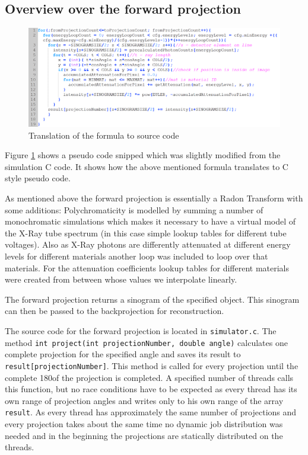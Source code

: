 \subsection{Overview over the forward projection}
\begin{figure}[h!]
	\centering
	\includegraphics[width=\linewidth]{images/MainLoop.png}
	\caption{Translation of the formula to source code}
	\label{MainLoop}
\end{figure}
\par Figure \ref{MainLoop} shows a pseudo code snipped which was slightly modified from the simulation C code. It shows how the above mentioned formula translates to C style pseudo code.
\par As mentioned above the forward projection is essentially a Radon Transform with some additions: Polychromaticity is modelled by summing a number of monochromatic simulations which makes it necessary to have a virtual model of the X-Ray tube spectrum (in this case simple lookup tables for different tube voltages). Also as X-Ray photons are differently attenuated at different energy levels for different materials another loop was included to loop over that materials. For the attenuation coefficients lookup tables for different materials were created from \cite{AttenuationTable} between whose values we interpolate linearly.
\par The forward projection returns a sinogram of the specified object. This sinogram can then be passed to the backprojection for reconstruction.
\par The source code for the forward projection is located in \verb!simulator.c!. The method \verb!int project(int projectionNumber, double angle)! calculates one complete projection for the specified angle and saves its result to \verb!result[projectionNumber]!. This method is called for every projection until the complete 180\textdegree of the projection is completed. A specified number of threads calls this function, but no race conditions have to be expected as every thread has its own range of projection angles and writes only to his own range of the array \verb!result!. As every thread has approximately the same number of projections and every projection takes about the same time no dynamic job distribution was needed and in the beginning the projections are statically distributed on the threads.
